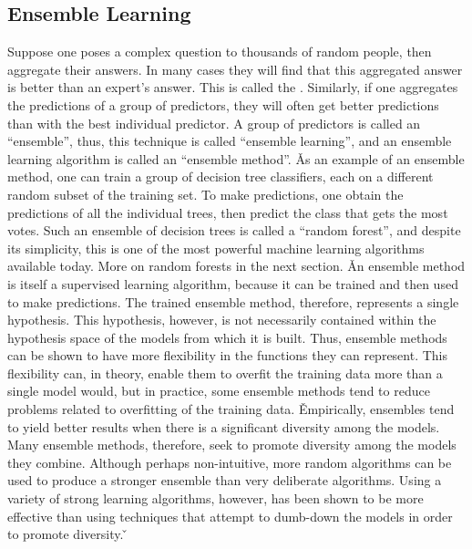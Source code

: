 \subsection{Ensemble Learning}

Suppose one poses a complex question to thousands of random people, then aggregate their answers. In many cases they
will find that this aggregated answer is better than an expert's answer. This is called the . 
Similarly, if one aggregates the predictions of a group of predictors, they will often get better predictions than
with the best individual predictor. A group of predictors is called an ``ensemble'', thus, this technique is called
``ensemble learning'', and an ensemble learning algorithm is called an ``ensemble method''. \v

As an example of an ensemble method, one can train a group of decision tree classifiers, each on a different random
subset of the training set. To make predictions, one obtain the predictions of all the individual trees, then predict
the class that gets the most votes. Such an ensemble of decision trees is called a ``random forest'', and despite its
simplicity, this is one of the most powerful machine learning algorithms available today. More on random forests in
the next section. \v

An ensemble method is itself a supervised learning algorithm, because it can be trained and then used to make
predictions. The trained ensemble method, therefore, represents a single hypothesis. This hypothesis, however, is not
necessarily contained within the hypothesis space of the models from which it is built. Thus, ensemble methods can be
shown to have more flexibility in the functions they can represent. This flexibility can, in theory, enable them to
overfit the training data more than a single model would, but in practice, some ensemble methods tend to reduce
problems related to overfitting of the training data. \v

Empirically, ensembles tend to yield better results when there is a significant diversity among the models. Many
ensemble methods, therefore, seek to promote diversity among the models they combine. Although perhaps non-intuitive,
more random algorithms can be used to produce a stronger ensemble than very deliberate algorithms. Using a variety of
strong learning algorithms, however, has been shown to be more effective than using techniques that attempt to
dumb-down the models in order to promote diversity. \v

